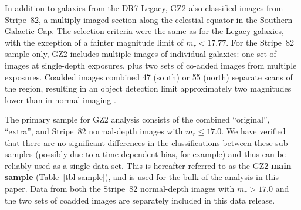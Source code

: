 \documentclass[useAMS,usenatbib]{mn2e}
\providecommand{\DIFaddtex}[1]{{\protect\color{blue}\uwave{#1}}} %
\providecommand{\DIFdeltex}[1]{{\protect\color{red}\sout{#1}}}                      %
\providecommand{\DIFaddbegin}{} %
\providecommand{\DIFaddend}{} %
\providecommand{\DIFdelbegin}{} %
\providecommand{\DIFdelend}{} %
\providecommand{\DIFadd}[1]{\texorpdfstring{\DIFaddtex{#1}}{#1}} %
\providecommand{\DIFdel}[1]{\texorpdfstring{\DIFdeltex{#1}}{}} %
\begin{document}
In addition to galaxies from the DR7 Legacy, GZ2 also classified images from Stripe~82, a multiply-imaged section along the celestial equator in the Southern Galactic Cap. The selection criteria were the same as for the Legacy galaxies, with the exception of a fainter magnitude limit of $m_r < 17.77$. For the Stripe~82 sample only, GZ2 includes multiple images of individual galaxies: one set of images at single-depth exposures, plus two sets of co-added images from multiple exposures. \DIFdelbegin \DIFdel{Coadded }\DIFdelend \DIFaddbegin \DIFadd{The coadded }\DIFaddend images combined 47 (south) or 55 (north) \DIFdelbegin \DIFdel{separate }\DIFdelend \DIFaddbegin \DIFadd{individual }\DIFaddend scans of the region, resulting in an object detection limit approximately two magnitudes lower than in normal imaging \citep{ann11}. 

The primary sample for GZ2 analysis consists of the combined ``original'', ``extra'', and Stripe~82 normal-depth images with $m_r\leq17.0$. We have verified that there are no significant differences in the classifications between these sub-samples (possibly due to a time-dependent bias, for example) and thus can be reliably used as a single data set. This is hereafter referred to as the GZ2 {\bf main sample} (Table~\ref{tbl-sample}), and is used for the bulk of the analysis in this paper. Data from both the Stripe~82 normal-depth images with $m_r>17.0$ and the two sets of coadded images are separately included in this data release. 
\end{document}
